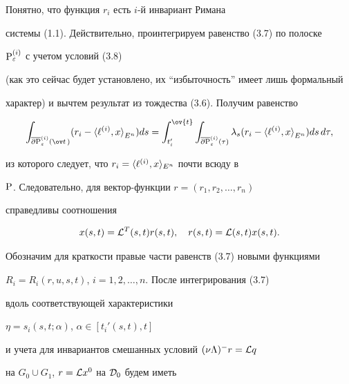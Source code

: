 Понятно, что функция $r_i$ есть $i$-й инвариант Римана


системы (1.1). Действительно, проинтегрируем равенство (3.7) по полоске


${\P}_{\varepsilon}^{(i)}$ с учетом условий (3.8)


(как это сейчас будет установлено, их ``избыточность'' имеет лишь формальный


характер) и вычтем результат из тождества (3.6). Получим равенство


$$


\int_{\overline{\partial{\P}}_{\varepsilon}^{(i)}(\ov t\,)}


( r_i - {\la \ell^{(i)},x \ra}_{E^n} ) ds =


\int_{t_{i}^{\prime}}^{\ov{t}}


\int_{\overline{\partial{\P}}_{\varepsilon}^{(i)}(\tau)}


\lambda_{s} ( r_i - {\la \ell^{(i)},x \ra}_{E^n} ) ds\, d\tau,


$$


из которого следует, что $r_i = \la \ell^{(i)},x \ra_{E^n}$ почти всюду в


${\P}$. Следовательно, для вектор-функции $r = (r_{1},r_{2},\dotsc,r_{n})$


справедливы соотношения


\begin{equation}


x(s,t) = {\cal L}^{T}(s,t) r(s,t),\quad r(s,t) = {\cal L}(s,t) x(s,t).


\end{equation}





Обозначим для краткости правые части равенств (3.7) новыми функциями


$R_i = R_{i}(r,u,s,t)$, $i = 1,2,\dotsc,n$. После интегрирования (3.7)


вдоль соответствующей характеристики


$\eta = s_{i}(s,t; \alpha)$, $\alpha \in [t_{i}'(s,t), t]$


и учета для инвариантов смешанных условий $(\nu \Lambda)^{-} r = {\cal L}q$


на $G_{0} \cup G_{1}$, $r = {\cal L} x^{0}$ на ${\cal D}_0$ будем иметь



